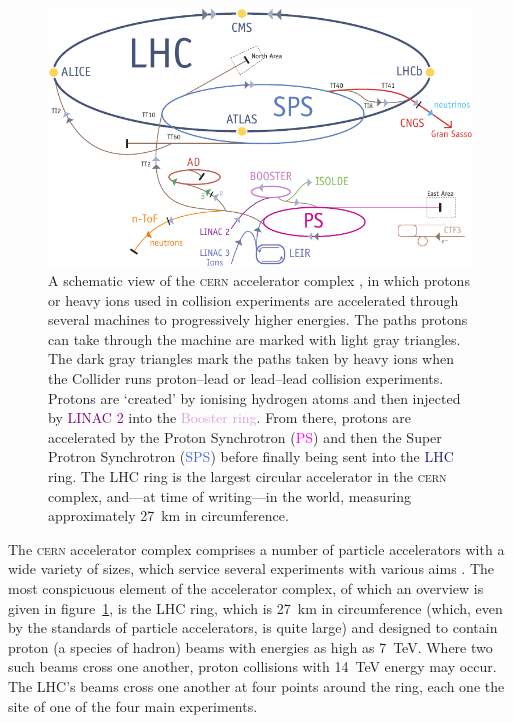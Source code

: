 \begin{figure}[htp]
\begin{center}
\includegraphics[width=.8\textwidth]{Cernrings}
\end{center}
\begin{minipage}[b]{\textwidth}
\caption{A schematic view of the \textsc{cern} accelerator complex \cite{cernbro}, in which protons or heavy ions used in collision experiments are accelerated through several machines to progressively higher energies. The paths protons can take through the machine are marked with light gray triangles. The dark gray triangles mark the paths taken by heavy ions when the Collider runs proton--lead or lead--lead collision experiments. Protons are `created' by ionising hydrogen atoms and then injected by \textcolor{Purple}{LINAC 2} into the \textcolor{Plum}{Booster ring}. From there, protons are accelerated by the Proton Synchrotron (\textcolor{Magenta}{PS}) and then the Super Protron Synchrotron (\textcolor{RoyalBlue}{SPS}) before finally being sent into the \textcolor{MidnightBlue}{LHC} ring. The LHC ring is the largest circular accelerator in the \textsc{cern} complex, and---at time of writing---in the world, measuring approximately 27~km in circumference.}
\label{cernrings}
\end{minipage}
\end{figure}

The \textsc{cern} accelerator complex comprises a number of particle accelerators with a wide variety of sizes, which service several experiments with various aims \cite{cernexps}. The most conspicuous element of the accelerator complex, of which an overview is given in figure~\ref{cernrings}, is the LHC ring, which is 27~km in circumference (which, even by the standards of particle accelerators, is quite large) and designed to contain proton (a species of hadron) beams with energies as high as 7~TeV. Where two such beams cross one another, proton collisions with 14~TeV energy may occur. The LHC's beams cross one another at four points around the ring, each one the site of one of the four main experiments.

